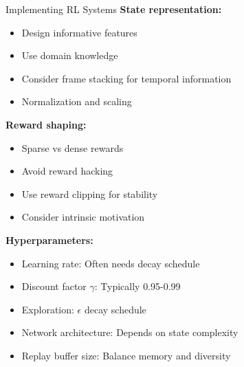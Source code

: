 \documentclass[aspectratio=169]{beamer}
\begin{document}
\begin{frame}{Implementing RL Systems}
  \textbf{State representation:}
  \begin{itemize}
    \item Design informative features
    \item Use domain knowledge
    \item Consider frame stacking for temporal information
    \item Normalization and scaling
  \end{itemize}

  \vspace{0.5em}

  \textbf{Reward shaping:}
  \begin{itemize}
    \item Sparse vs dense rewards
    \item Avoid reward hacking
    \item Use reward clipping for stability
    \item Consider intrinsic motivation
  \end{itemize}

  \vspace{0.5em}

  \textbf{Hyperparameters:}
  \begin{itemize}
    \item Learning rate: Often needs decay schedule
    \item Discount factor $\gamma$: Typically 0.95-0.99
    \item Exploration: $\epsilon$ decay schedule
    \item Network architecture: Depends on state complexity
    \item Replay buffer size: Balance memory and diversity
  \end{itemize}
\end{frame}
\end{document}
